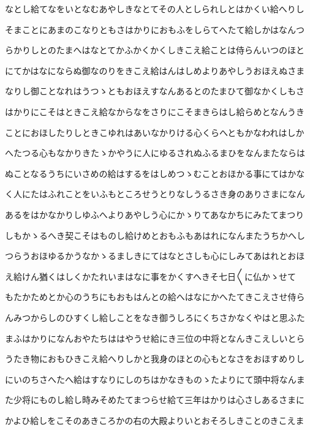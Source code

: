 \documentclass[a4paper,11pt,landscape]{ltjtarticle}
\begin{document}
なとし給てなをいとなむあやしきなとてその人としられしとはかくい給へりし
\par\medskip
そまことにあまのこなりともさはかりにおもふをしらてへたて給しかはなんつ
\par\medskip
らかりしとのたまへはなとてかふかくかくしきこえ給ことは侍らんいつのほと
\par\medskip
にてかはなにならぬ御なのりをきこえ給はんはしめよりあやしうおほえぬさま
\par\medskip
なりし御ことなれはうつゝともおほえすなんあるとのたまひて御なかくしもさ
\par\medskip
はかりにこそはときこえ給なからなをさりにこそまきらはし給らめとなんうき
\par\medskip
ことにおほしたりしときこゆれはあいなかりける心くらへともかなわれはしか
\par\medskip
へたつる心もなかりきたゝかやうに人にゆるされぬふるまひをなんまたならは
\par\medskip
ぬことなるうちにいさめの給はするをはしめつゝむことおほかる事にてはかな
\par\medskip
く人にたはふれことをいふもところせうとりなしうるさき身のありさまになん
\par\medskip
あるをはかなかりしゆふへよりあやしう心にかゝりてあなかちにみたてまつり
\par\medskip
しもかゝるへき契こそはものし給けめとおもふもあはれになんまたうちかへし
\par\medskip
つらうおほゆるかうなかゝるましきにてはなとさしも心にしみてあはれとおほ
\par\medskip
え給けん猶くはしくかたれいまはなに事をかくすへきそ七日〱に仏かゝせて
\par\medskip
もたかためとか心のうちにもおもはんとの給へはなにかへたてきこえさせ侍ら
\par\medskip
んみつからしのひすくし給しことをなき御うしろにくちさかなくやはと思ふた
\par\medskip
まふはかりになんおやたちははやうせ給にき三位の中将となんきこえしいとら
\par\medskip
うたき物におもひきこえ給へりしかと我身のほとの心もとなさをおほすめりし
\par\medskip
にいのちさへたへ給はすなりにしのちはかなきものゝたよりにて頭中将なんま
\par\medskip
た少将にものし給し時みそめたてまつらせ給て三年はかりは心さしあるさまに
\par\medskip
かよひ給しをこそのあきころかの右の大殿よりいとおそろしきことのきこえま
\par\medskip
\end{document}
